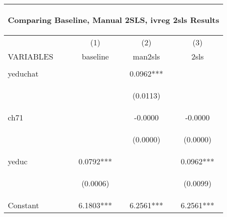 \begin{center}
\begin{tabular}{lccc}
\multicolumn{4}{c}{\begin{large}Comparing Baseline, Manual 2SLS, ivreg 2sls Results\end{large}} \\ \hline
 & (1) & (2) & (3) \\
VARIABLES & baseline & man2sls & 2sls \\ \hline
\vspace{4pt} & \begin{footnotesize}\end{footnotesize} & \begin{footnotesize}\end{footnotesize} & \begin{footnotesize}\end{footnotesize} \\
yeduchat &  & 0.0962*** &  \\
\vspace{4pt} & \begin{footnotesize}\end{footnotesize} & \begin{footnotesize}(0.0113)\end{footnotesize} & \begin{footnotesize}\end{footnotesize} \\
ch71 &  & -0.0000 & -0.0000 \\
\vspace{4pt} & \begin{footnotesize}\end{footnotesize} & \begin{footnotesize}(0.0000)\end{footnotesize} & \begin{footnotesize}(0.0000)\end{footnotesize} \\
yeduc & 0.0792*** &  & 0.0962*** \\
\vspace{4pt} & \begin{footnotesize}(0.0006)\end{footnotesize} & \begin{footnotesize}\end{footnotesize} & \begin{footnotesize}(0.0099)\end{footnotesize} \\
Constant & 6.1803*** & 6.2561*** & 6.2561*** \\

\end{tabular}
\end{center}
